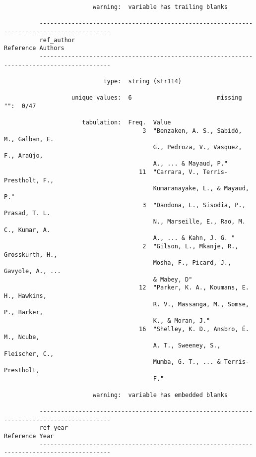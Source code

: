\documentclass{article}
\begin{document}
\begin{verbatim}
                         warning:  variable has trailing blanks
          
          ------------------------------------------------------------------------------------------
          ref_author                                                               Reference Authors
          ------------------------------------------------------------------------------------------
          
                            type:  string (str114)
          
                   unique values:  6                        missing "":  0/47
          
                      tabulation:  Freq.  Value
                                       3  "Benzaken, A. S., Sabidó, M., Galban, E.
                                          G., Pedroza, V., Vasquez, F., Araújo,
                                          A., ... & Mayaud, P."
                                      11  "Carrara, V., Terris-Prestholt, F.,
                                          Kumaranayake, L., & Mayaud, P."
                                       3  "Dandona, L., Sisodia, P., Prasad, T. L.
                                          N., Marseille, E., Rao, M. C., Kumar, A.
                                          A., ... & Kahn, J. G. "
                                       2  "Gilson, L., Mkanje, R., Grosskurth, H.,
                                          Mosha, F., Picard, J., Gavyole, A., ...
                                          & Mabey, D"
                                      12  "Parker, K. A., Koumans, E. H., Hawkins,
                                          R. V., Massanga, M., Somse, P., Barker,
                                          K., & Moran, J."
                                      16  "Shelley, K. D., Ansbro, É. M., Ncube,
                                          A. T., Sweeney, S., Fleischer, C.,
                                          Mumba, G. T., ... & Terris-Prestholt,
                                          F."
          
                         warning:  variable has embedded blanks
          
          ------------------------------------------------------------------------------------------
          ref_year                                                                    Reference Year
          ------------------------------------------------------------------------------------------
          

\end{verbatim}
\end{document}
